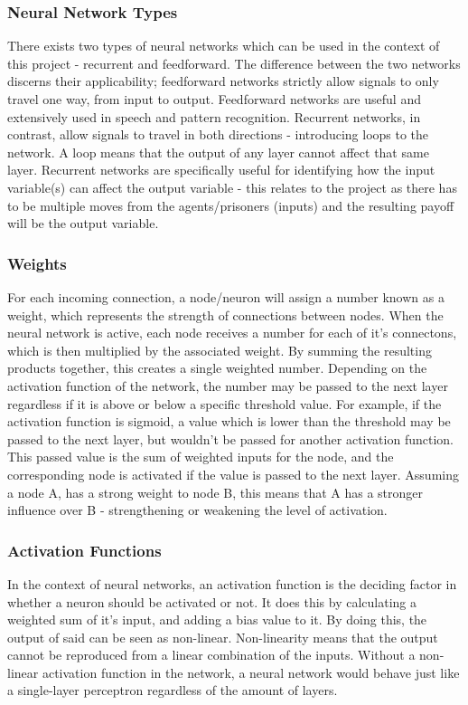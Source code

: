 \documentclass[12pt,a4paper]{article}
\begin{document}
\subsubsection{Neural Network Types}
There exists two types of neural networks which can be used in the context of this project - recurrent and feedforward. The difference between the two networks discerns their applicability; feedforward networks strictly allow signals to only travel one way, from input to output. Feedforward networks are useful and extensively used in speech and pattern recognition. Recurrent networks, in contrast, allow signals to travel in both directions - introducing loops to the network. A loop means that the output of any layer cannot affect that same layer. Recurrent networks are specifically useful for identifying how the input variable(s) can affect the output variable - this relates to the project as there has to be multiple moves from the agents/prisoners (inputs) and the resulting payoff will be the output variable.

\subsubsection{Weights}
For each incoming connection, a node/neuron will assign a number known as a weight, which represents the strength of connections between nodes. When the neural network is active, each node receives a number for each of it's connectons, which is then multiplied by the associated weight. By summing the resulting products together, this creates a single weighted number. Depending on the activation function of the network, the number may be passed to the next layer regardless if it is above or below a specific threshold value. For example, if the activation function is sigmoid, a value which is lower than the threshold may be passed to the next layer, but wouldn't be passed for another activation function. This passed value is the sum of weighted inputs for the node, and the corresponding node is activated if the value is passed to the next layer. Assuming a node A, has a strong weight to node B, this means that A has a stronger influence over B - strengthening or weakening the level of activation.

\subsubsection{Activation Functions}
In the context of neural networks, an activation function is the deciding factor in whether a neuron should be activated or not. It does this by calculating a weighted sum of it's input, and adding a bias value to it. By doing this, the output of said can be seen as non-linear. Non-linearity means that the output cannot be reproduced from a linear combination of the inputs. Without a non-linear activation function in the network, a neural network would behave just like a single-layer perceptron regardless of the amount of layers.
\end{document}
